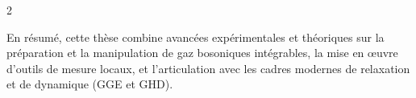 \documentclass[french,12pt,a4paper]{book}
\begin{document}
\begin{mdframed}[linecolor=Prune,linewidth=1]
\begin{multicols}{2}
{\medskip

En résumé, cette thèse combine avancées expérimentales et théoriques sur la préparation et la manipulation de gaz bosoniques intégrables, la mise en œuvre d’outils de mesure locaux, et l’articulation avec les cadres modernes de relaxation et de dynamique (GGE et GHD).





}
\end{multicols}
\end{mdframed}
\end{document}
